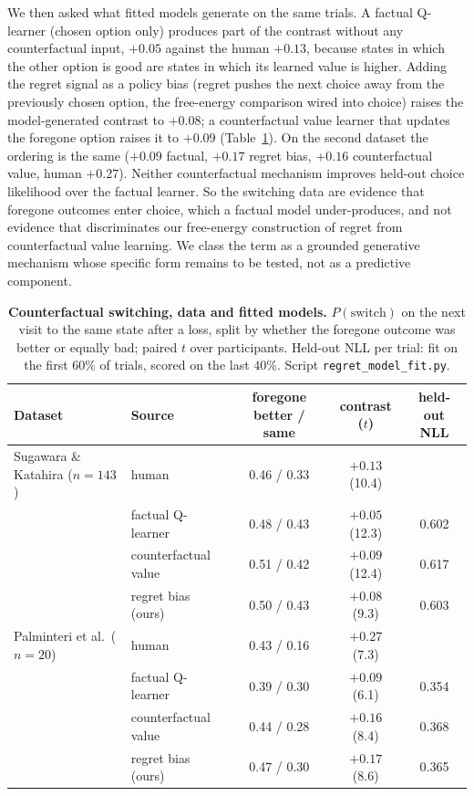 \documentclass[11pt,a4paper]{article}
\begin{document}
We then asked what fitted models generate on the same trials. A factual Q-learner
(chosen option only) produces part of the contrast without any counterfactual input,
$+0.05$ against the human $+0.13$, because states in which the other option is good
are states in which its learned value is higher. Adding the regret signal as a policy
bias (regret pushes the next choice away from the previously chosen option, the
free-energy comparison wired into choice) raises the model-generated contrast to
$+0.08$; a counterfactual value learner that updates the foregone option raises it to
$+0.09$ (Table~\ref{tab:regret}). On the second dataset the ordering is the same
($+0.09$ factual, $+0.17$ regret bias, $+0.16$ counterfactual value, human $+0.27$).
Neither counterfactual mechanism improves held-out choice likelihood over the factual
learner. So the switching data are evidence that foregone outcomes enter choice, which
a factual model under-produces, and not evidence that discriminates our free-energy
construction of regret from counterfactual value learning. We class the term as a
grounded generative mechanism whose specific form remains to be tested, not as a
predictive component.

\begin{table}[htbp]
\centering\small
\caption{\textbf{Counterfactual switching, data and fitted models.} $P(\text{switch})$
on the next visit to the same state after a loss, split by whether the foregone outcome
was better or equally bad; paired $t$ over participants. Held-out NLL per trial: fit on
the first $60\%$ of trials, scored on the last $40\%$. Script
\texttt{regret\_model\_fit.py}.}
\label{tab:regret}
\begin{tabular}{llccc}
\toprule
Dataset & Source & foregone better / same & contrast ($t$) & held-out NLL \\
\midrule
Sugawara \& Katahira ($n{=}143$) & human & 0.46 / 0.33 & $+0.13$ (10.4) & \\
 & factual Q-learner & 0.48 / 0.43 & $+0.05$ (12.3) & 0.602 \\
 & counterfactual value & 0.51 / 0.42 & $+0.09$ (12.4) & 0.617 \\
 & regret bias (ours) & 0.50 / 0.43 & $+0.08$ (9.3) & 0.603 \\
\midrule
Palminteri et al.\ ($n{=}20$) & human & 0.43 / 0.16 & $+0.27$ (7.3) & \\
 & factual Q-learner & 0.39 / 0.30 & $+0.09$ (6.1) & 0.354 \\
 & counterfactual value & 0.44 / 0.28 & $+0.16$ (8.4) & 0.368 \\
 & regret bias (ours) & 0.47 / 0.30 & $+0.17$ (8.6) & 0.365 \\
\bottomrule
\end{tabular}
\end{table}
\end{document}
